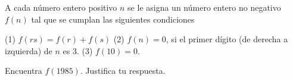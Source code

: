 A cada número entero positivo $n$ se le asigna un número entero no negativo $f(n)$ tal que se cumplan las siguientes condiciones

(1) $f(rs) = f(r)+f(s)$
(2) $f(n) = 0$, si el primer dígito (de derecha a izquierda) de $n$ es 3.
(3) $f(10) = 0$.

Encuentra $f(1985)$. Justifica tu respuesta.
